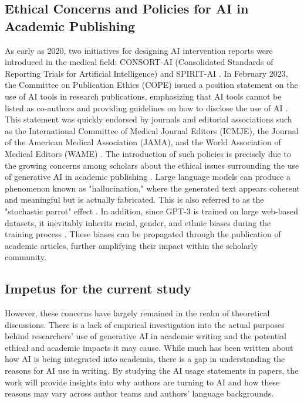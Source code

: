 \subsection{Ethical Concerns and Policies for AI in Academic Publishing}
As early as 2020, two initiatives for designing AI intervention reports were introduced in the medical field: CONSORT-AI (Consolidated Standards of Reporting Trials for Artificial Intelligence) and SPIRIT-AI \citep{Liu2020,CruzRivera2020}. In February 2023, the Committee on Publication Ethics (COPE) issued a position statement on the use of AI tools in research publications, emphasizing that AI tools cannot be listed as co-authors and providing guidelines on how to disclose the use of AI \citep{COPE2023}. This statement was quickly endorsed by journals and editorial associations such as the International Committee of Medical Journal Editors (ICMJE), the Journal of the American Medical Association (JAMA), and the World Association of Medical Editors (WAME) \citep{ICMJE2023,Flanagin2023,WAME2023}.  The introduction of such policies is precisely due to the growing concerns among scholars about the ethical issues surrounding the use of generative AI in academic publishing \citep{Anderson2023}.  Large language models can produce a phenomenon known as "hallucination," where the generated text appears coherent and meaningful but is actually fabricated. This is also referred to as the "stochastic parrot" effect \citep{Hutson2021,Ji2023}. In addition, since GPT-3 is trained on large web-based datasets, it inevitably inherits racial, gender, and ethnic biases during the training process \citep{Basta2019,Founta2018,Hutchinson2020}. These biases can be propagated through the publication of academic articles, further amplifying their impact within the scholarly community. 
\subsection{Impetus for the current study}
However, these concerns have largely remained in the realm of theoretical discussions. There is a lack of empirical investigation into the actual purposes behind researchers' use of generative AI in academic writing and the potential ethical and academic impacts it may cause. While much has been written about how AI is being integrated into academia, there is a gap in understanding the reasons for AI use in writing.
By studying the AI usage statements in papers, the work will provide insights into why authors are turning to AI and how these reasons may vary across  author teams and authors' language backgrounds.